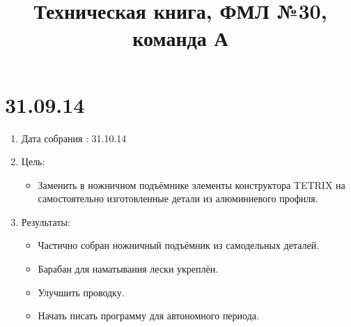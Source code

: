 \documentclass[12pt]{article}
\title{ Техническая книга, ФМЛ №30, команда А}
\begin{document}
	\section{31.09.14}
	\begin{enumerate}
		\item Дата собрания : 31.10.14
		\item Цель:
		\begin{itemize}
			\item Заменить в ножничном подъёмнике элементы конструктора TETRIX на самостоятельно изготовленные детали из алюминиевого профиля.
	    \end{itemize}
	    \item Результаты:
	    \begin{itemize}
	    	\item Частично собран ножничный подъёмник из самодельных деталей.
	    	\item Барабан для наматывания лески укреплён.
	    \end{itemize}
	    \begin{itemize}
	   	    \item Улучшить проводку.
	   	    \item Начать писать программу для автономного периода.
	   	\end{itemize}
    \end{enumerate}    	
\end{document}
